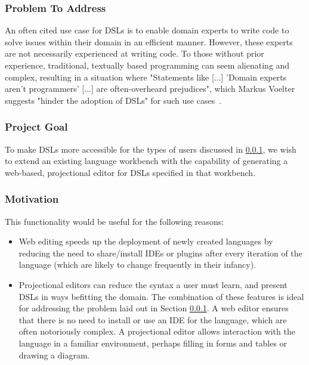 \documentclass{article}
\begin{document}
\subsubsection{Problem To Address}\label{problem}

An often cited use case for DSLs is to enable domain experts to write code to solve issues within their domain in an efficient manner. However, these experts are not necessarily experienced at writing code. To those without prior experience, traditional, textually based programming can seem alienating and complex, resulting in a situation where "Statements like [...] 'Domain experts aren't programmers' [...] are often-overheard prejudices", which Markus Voelter suggests "hinder the adoption of DSLs" for such use cases~\cite[pg.45]{dslEngineering}.

\subsubsection{Project Goal}\label{goal}
To make DSLs more accessible for the types of users discussed in \ref{problem}, we wish to extend an existing language workbench with the capability of generating a web-based, projectional editor for DSLs specified in that workbench. 

\subsubsection{Motivation}\label{motivation}
This functionality would be useful for the following reasons:
\begin{itemize}
\item Web editing speeds up the deployment of newly created languages by reducing the need to share/install IDEs or plugins after every iteration of the language (which are likely to change frequently in their infancy). 
\item Projectional editors can reduce the syntax a user must learn, and present DSLs in ways befitting the domain.
The combination of these features is ideal for addressing the problem laid out in Section \ref{problem}. A web editor ensures that there is no need to install or use an IDE for the language, which are often notoriously complex. A projectional editor allows interaction with the language in a familiar environment, perhaps filling in forms and tables or drawing a diagram.  
\end{itemize} 
\end{document}
